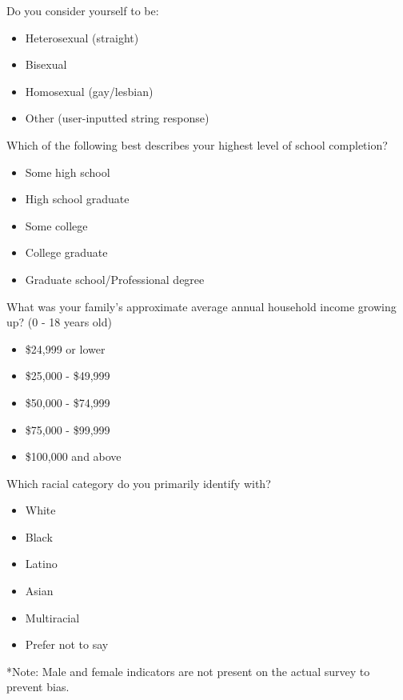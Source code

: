 \documentclass[twoside]{report}
\begin{document}
\begin{multicols}{2}
Do you consider yourself to be:

\begin{itemize}
\item
  Heterosexual (straight)
\end{itemize}

\begin{itemize}
\item
  Bisexual
\item
  Homosexual (gay/lesbian)
\item
  Other (user-inputted string response)
\end{itemize}

Which of the following best describes your highest level of school
completion?

\begin{itemize}
\item
  Some high school
\end{itemize}

\begin{itemize}
\item
  High school graduate
\item
  Some college
\item
  College graduate
\item
  Graduate school/Professional degree
\end{itemize}

What was your family's approximate average annual household income
growing up? (0 - 18 years old)

\begin{itemize}
\item
  \$24,999 or lower
\end{itemize}

\begin{itemize}
\item
  \$25,000 - \$49,999
\item
  \$50,000 - \$74,999
\item
  \$75,000 - \$99,999
\item
  \$100,000 and above
\end{itemize}

Which racial category do you primarily identify with?

\begin{itemize}
\item
  White
\end{itemize}

\begin{itemize}
\item
  Black
\item
  Latino
\item
  Asian
\item
  Multiracial
\item
  Prefer not to say
\end{itemize}

*Note: Male and female indicators are not present on the actual survey
to prevent bias.

\end{multicols}
\end{document}
